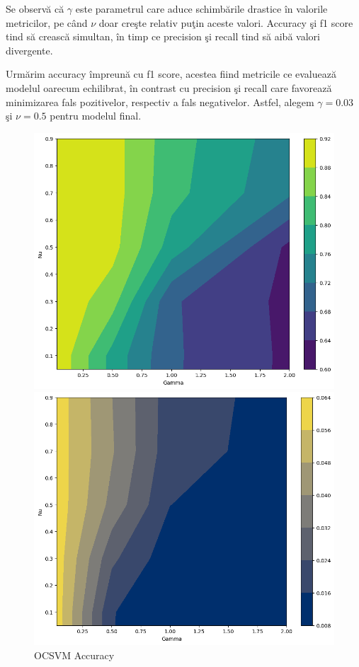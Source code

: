 Se observă că $\gamma$ este parametrul care aduce schimbările drastice în valorile 
metricilor, pe când $\nu$ doar creşte relativ puţin aceste valori. Accuracy şi f1 score 
tind să crească simultan, în timp ce precision şi recall tind să aibă valori 
divergente.

Urmărim accuracy împreună cu f1 score, acestea fiind metricile ce evaluează modelul oarecum 
echilibrat, în contrast cu precision şi recall care favorează minimizarea fals pozitivelor, 
respectiv a fals negativelor. Astfel, alegem $\gamma=0.03$ şi $\nu=0.5$ pentru modelul final.

\begin{figure}[p] %
    \begin{minipage}[t]{0.5\textwidth}
        \vspace{0pt}
        \includegraphics[width=\textwidth]{images/ocsvm-accuracy.png}
        \caption{OCSVM Accuracy}
    \end{minipage}
    \hfill
    \begin{minipage}[t]{0.5\textwidth}
        \vspace{0pt}
        \includegraphics[width=\textwidth]{images/ocsvm-precision.png}

\end{minipage}
\end{figure}
